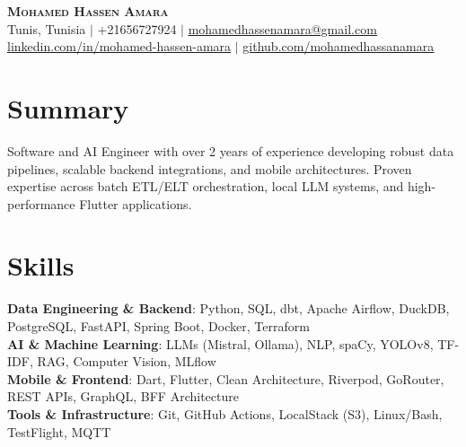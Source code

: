 \documentclass[letterpaper,10pt]{article}
\begin{document}
\begin{center}
    \textbf{\Huge \scshape \textcolor{primaryColor}{Mohamed Hassen Amara}} \\ \vspace{4pt}
    \small
     Tunis, Tunisia \hspace{1pt}$|$\hspace{1pt}
     +21656727924 \hspace{1pt}$|$\hspace{1pt}
     \href{mailto:mohamedhassenamara@gmail.com}{\underline{mohamedhassenamara@gmail.com}} \\ \vspace{2pt}
     \href{https://linkedin.com/in/mohamed-hassen-amara}{\underline{linkedin.com/in/mohamed-hassen-amara}} \hspace{1pt}$|$\hspace{1pt}
     \href{https://github.com/mohamedhassanamara}{\underline{github.com/mohamedhassanamara}}
\end{center}

\section{Summary}
\small{Software and AI Engineer with over 2 years of experience developing robust data pipelines, scalable backend integrations, and mobile architectures. Proven expertise across batch ETL/ELT orchestration, local LLM systems, and high-performance Flutter applications.}

\section{Skills}
 \begin{itemize}[leftmargin=0pt, label={}, itemsep=1.5pt, topsep=1pt]
    \small{\item{
     \textbf{Data Engineering \& Backend}{: Python, SQL, dbt, Apache Airflow, DuckDB, PostgreSQL, FastAPI, Spring Boot, Docker, Terraform} \\
     \textbf{AI \& Machine Learning}{: LLMs (Mistral, Ollama), NLP, spaCy, YOLOv8, TF-IDF, RAG, Computer Vision, MLflow} \\
     \textbf{Mobile \& Frontend}{: Dart, Flutter, Clean Architecture, Riverpod, GoRouter, REST APIs, GraphQL, BFF Architecture} \\
     \textbf{Tools \& Infrastructure}{: Git, GitHub Actions, LocalStack (S3), Linux/Bash, TestFlight, MQTT}
    }}
 \end{itemize}
\end{document}

